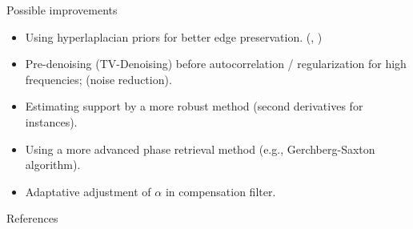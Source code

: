 \documentclass{beamer}
\begin{document}


\begin{frame}{Possible improvements}
    \begin{itemize}
        \item Using hyperlaplacian priors for better edge preservation. (\cite{hyperlaplacian}, \cite{hyperlap_blind})
        \item Pre-denoising (TV-Denoising) before autocorrelation / regularization for high frequencies; (noise reduction).
        \item Estimating support by a more robust method (second derivatives for instances).
        \item Using a more advanced phase retrieval method (e.g., Gerchberg-Saxton algorithm).
        \item Adaptative adjustment of $\alpha$ in compensation filter.
    \end{itemize}
\end{frame}

\begin{frame}[allowframebreaks]{References}
    \tiny
    \printbibliography
\end{frame}
\end{document}
